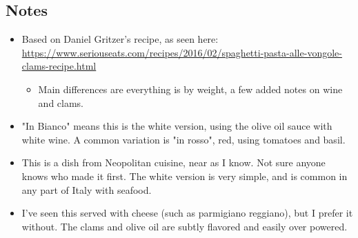 \begin{multicols}{2}
\subsection*{Notes}
\begin{itemize}
    \item Based on Daniel Gritzer's recipe, as seen here: \url{https://www.seriouseats.com/recipes/2016/02/spaghetti-pasta-alle-vongole-clams-recipe.html}
    \begin{itemize}
        \item Main differences are everything is by weight, a few added notes on wine and clams.
    \end{itemize}
    \item "In Bianco" means this is the white version, using the olive oil sauce with white wine. A common variation is "in rosso", red, using tomatoes and basil.
    \item This is a dish from Neopolitan cuisine, near as I know. Not sure anyone knows who made it first. The white version is very simple, and is common in any part of Italy with seafood.
    \item I've seen this served with cheese (such as parmigiano reggiano), but I prefer it without. The clams and olive oil are subtly flavored and easily over powered.
\end{itemize}
\end{multicols}
\clearpage